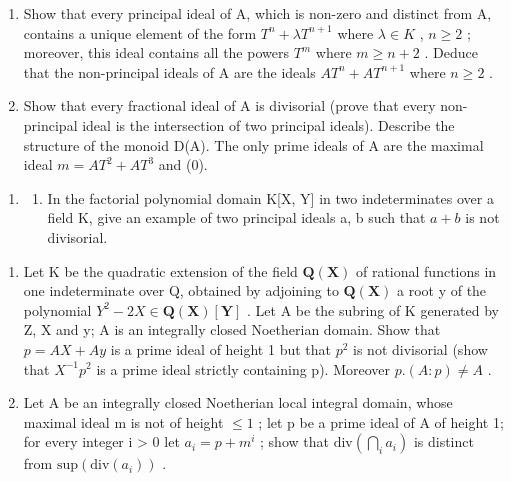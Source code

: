 \begin{enumerate}
\def\labelenumi{(\alph{enumi})}
\item
  Show that every principal ideal of A, which is non-zero and distinct from A, contains a unique element of the form \(T^{n} + \lambda T^{n+1}\) where \(\lambda \in K\) , \(n \geqslant 2\) ; moreover, this ideal contains all the powers \(T^{m}\) where \(m \geqslant n + 2\) . Deduce that the non-principal ideals of A are the ideals \(AT^{n} + AT^{n+1}\) where \(n \geqslant 2\) .
\item
  Show that every fractional ideal of A is divisorial (prove that every non-principal ideal is the intersection of two principal ideals). Describe the structure of the monoid D(A). The only prime ideals of A are the maximal ideal \(m = AT^{2} + AT^{3}\) and (0).
\end{enumerate}

\begin{enumerate}
\def\labelenumi{\arabic{enumi}.}
\setcounter{enumi}{1}
\tightlist
\item
  \begin{enumerate}
  \def\labelenumii{(\alph{enumii})}
  \tightlist
  \item
    In the factorial polynomial domain K{[}X, Y{]} in two indeterminates over a field K, give an example of two principal ideals a, b such that \(a + b\) is not divisorial.
  \end{enumerate}
\end{enumerate}

\begin{enumerate}
\def\labelenumi{(\alph{enumi})}
\setcounter{enumi}{1}
\item
  Let K be the quadratic extension of the field \(\mathbf{Q}(\mathbf{X})\) of rational functions in one indeterminate over Q, obtained by adjoining to \(\mathbf{Q}(\mathbf{X})\) a root y of the polynomial \(Y^{2}-2X\in\mathbf{Q}(\mathbf{X})[\mathbf{Y}]\) . Let A be the subring of K generated by Z, X and y; A is an integrally closed Noetherian domain. Show that \(p=AX+Ay\) is a prime ideal of height 1 but that \(p^{2}\) is not divisorial (show that \(X^{-1}p^{2}\) is a prime ideal strictly containing p). Moreover \(p.(A:p)\neq A\) .
\item
  Let A be an integrally closed Noetherian local integral domain, whose maximal ideal m is not of height \(\leqslant1\) ; let p be a prime ideal of A of height 1; for every integer i \textgreater{} 0 let \(a_{i} = p + m^{i}\) ; show that \(\text{div}\left(\bigcap_{i} a_{i}\right)\) is distinct from \(\text{sup}(\text{div}(a_{i}))\) .
\end{enumerate}

